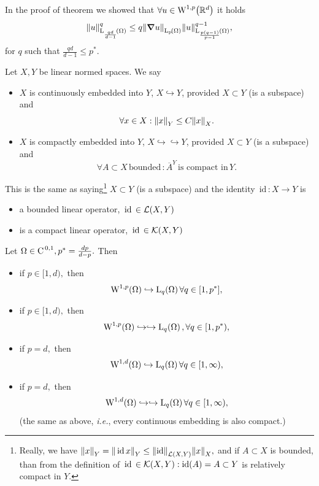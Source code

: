 \documentclass{article}
\begin{document}
\begin{remark}
	In the proof of theorem we showed that $\forall u \in \WkpSet[1][p]{\R^d}$ it holds
	\[
		\norm{u}_{\LpSet[\frac{qd}{d-1}]{\Omega}}^q \leq q\norm{\grad u}_{\LpSet{\Omega}} \norm{u}_{\LpSet[\frac{p\qty(q-1)}{p-1}]{\Omega}}^{q-1},
	\]
	for $q$ such that $\frac{qd}{d-1}\leq p^{*}$.
\end{remark}


\begin{definition}
    Let $X,Y$ be linear normed spaces. We say 

    \begin{itemize}
	    \item $X$ is continuously embedded into $Y$, $X \hookrightarrow Y$, provided $X \subset Y$ (is a subspace) and
		    \[
			    \forall x \in X: \norm{x}_Y \leq C \norm{x}_X.
		    \]
	    \item $X$ is compactly embedded into $Y$, $X \hookrightarrow \hookrightarrow Y$, provided $X \subset Y$ (is a subspace) and
		    \[
			    \forall A \subset X \, \text{bounded} \,: \overline{A}^{Y} \, \text{is compact in} \, Y.
		    \]
    \end{itemize}
    This is the same as saying\footnote{Really, we have $\norm{x}_{Y} = \norm{\, \text{id} \,x}_Y \leq \norm{\text{id}}_{\mathcal{L}\qty(X,Y)}\norm{x}_X,$ and if $A \subset X$ is bounded, than from the definition of $\, \text{id} \, \in \mathcal{K}\qty(X,Y): \text{id}(A) = A \subset Y$ is relatively compact in $Y$.} $X \subset Y$ (is a subspace) and the identity $\, \text{id} \,: X \to Y$ is
    \begin{itemize}
	    \item a bounded linear operator, $\, \text{id} \, \in \mathcal{L}\qty(X,Y)$
	    \item is a compact linear operator, $\, \text{id} \, \in \mathcal{K}\qty(X,Y)$
    \end{itemize}
\end{definition}

\begin{theorem}
	Let $\Omega \in \text{C}^{\!\,\, 0,1}, p^{*} = \frac{dp}{d-p}.$ Then

	\begin{itemize}
		\item if $p \in [1,d),$ then
			\[
				\WkpSet[1][p]{\Omega} \hookrightarrow \LpSet[q]{\Omega} \forall q \in [1,p^{*}],
			\]
		\item if $p \in [1,d),$ then
			\[
				\WkpSet[1][p]{\Omega} \hookrightarrow \hookrightarrow \LpSet[q]{\Omega}, \forall q \in [1,p^{*}),
			\]
		\item if $p = d,$ then
			\[
				\WkpSet[1][d]{\Omega} \hookrightarrow \LpSet[q]{\Omega} \forall q \in [1, \infty),
			\]
		\item if $p = d, $ then
			\[
				\WkpSet[1][d]{\Omega} \hookrightarrow \hookrightarrow \LpSet[q]{\Omega} \forall q \in [1,\infty),
			\]
			(the same as above, \textit{i.e.}, every continuous embedding is also compact.)
	\end{itemize}
\end{theorem}
\end{document}
